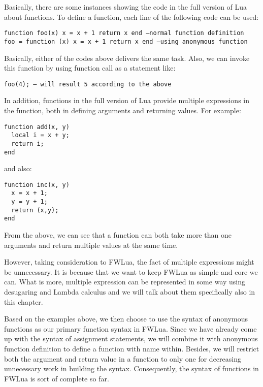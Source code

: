 \documentclass{article}
\begin{document}
Basically, there are some instances showing the code in the full version of Lua about functions. To define a function, each line of the following code can be used:
\begin{flushleft}
\tt function foo(x) x = x + 1 return x end --normal function definition\\
\tt foo = function (x) x = x + 1 return x end --using anonymous function\\
\end{flushleft}
Basically, either of the codes above delivers the same task. Also, we can invoke this function by using function call as a statement like:
\begin{flushleft}
\tt foo(4); -- will result 5 according to the above \\
\end{flushleft}
In addition, functions in the full version of Lua provide multiple expressions in the function, both in defining arguments and returning values. For example:
\begin{flushleft}
\tt function add(x, y) \\
\tt ~~local i = x + y;\\
\tt ~~return i;\\
\tt end\\
\end{flushleft}
and also:
\begin{flushleft}
\tt function inc(x, y) \\
\tt ~~x = x + 1;\\
\tt ~~y = y + 1;\\
\tt ~~return (x,y);\\
\tt end\\
\end{flushleft}
From the above, we can see that a function can both take more than one arguments and return multiple values at the same time.

However, taking consideration to FWLua, the fact of multiple expressions might be unnecessary. It is because that we want to keep FWLua as simple and core we can. What is more, multiple expression can be represented in some way using desugaring and Lambda calculus and we will talk about them specifically also in this chapter.

Based on the examples above, we then choose to use the syntax of anonymous functions as our primary function syntax in FWLua. Since we have already come up with the syntax of assignment statements, we will combine it with anonymous function definition to define a function with name within. Besides, we will restrict both the argument and return value in a function to only one for decreasing unnecessary work in building the syntax. Consequently, the syntax of functions in FWLua is sort of complete so far.
\end{document}
